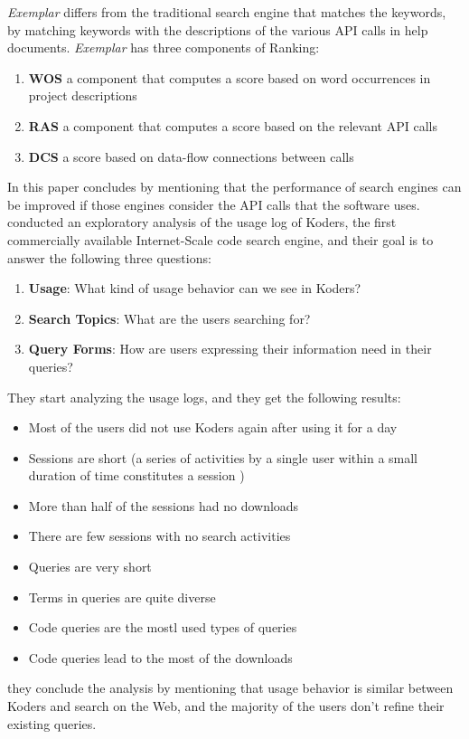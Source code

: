 \documentclass[12pt,mscthesis]{usiinfthesis}
\begin{document}
	 \textit{Exemplar} differs from the traditional search engine that matches the keywords, by matching keywords with the descriptions of the various API calls in help documents.
	\textit{Exemplar} has three components of Ranking: 
	\begin{enumerate}
		\item \textbf{WOS} a component that computes a score based on word occurrences in project descriptions
		\item \textbf{RAS} a component that computes a score based on the relevant API calls
		\item \textbf{DCS} a score based on data-flow connections between calls
	\end{enumerate}
	In this paper \citet{McMillan:2011:FRF:1985793.1986032} concludes by mentioning that the performance of search engines can be improved if those engines consider the API calls that the software uses.\\

	
	\citet{Bajracharya2012} conducted an exploratory analysis of the usage log of Koders, the first commercially available Internet-Scale code search engine, and their goal is to answer the following three questions:\\
	\begin{enumerate}
	\item \textbf{Usage}: What kind of usage behavior can we see in Koders?
	\item \textbf{Search Topics}: What are the users searching for?
	\item \textbf{Query Forms}: How are users expressing their information need in their queries?
	\end{enumerate}
	They start analyzing the usage logs, and they get the following results: 
	\begin{itemize}
	\item Most of the users did not use Koders again after using it for a day
	\item Sessions are short (a series of activities by a single user within a small duration of time constitutes a session )
	\item More than half of the sessions had no downloads
	\item There are few sessions with no search activities
	\item Queries are very short
	\item Terms in queries are quite diverse
	\item Code queries are the mostl used types of queries
	\item Code queries lead to the most of the downloads
	\end{itemize}
	they conclude the analysis by mentioning that usage behavior is similar between Koders and search on the Web, and the majority of the users don't refine their existing queries.\\
\end{document}
